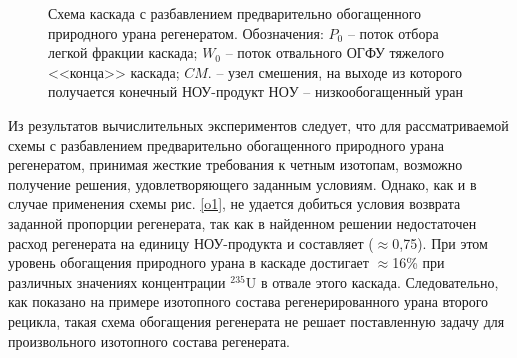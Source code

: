 \begin{figure}[ht]
  \caption{Схема каскада с разбавлением предварительно обогащенного природного урана регенератом. Обозначения: $P_0$ -- поток отбора легкой фракции каскада; $W_0$ -- поток отвального ОГФУ тяжелого <<конца>> каскада; $CM.$ -- узел смешения, на выходе из которого получается конечный НОУ-продукт $НОУ$  -- низкообогащенный уран}\label{o2}
\end{figure}

Из результатов вычислительных экспериментов следует, что для рассматриваемой схемы с разбавлением предварительно обогащенного природного урана регенератом, принимая жесткие требования к четным изотопам, возможно получение решения, удовлетворяющего заданным условиям. Однако, как и в случае применения схемы рис. \ref{o1}, не удается добиться условия возврата заданной пропорции регенерата, так как в найденном решении недостаточен расход регенерата на единицу НОУ-продукта и составляет ($\approx$0,75). При этом уровень обогащения природного урана в каскаде достигает $\approx$16\% при различных значениях концентрации $^{235}$U в отвале этого каскада. Следовательно, как показано на примере изотопного состава регенерированного урана второго рецикла, такая схема обогащения регенерата не решает поставленную задачу для произвольного изотопного состава регенерата.


